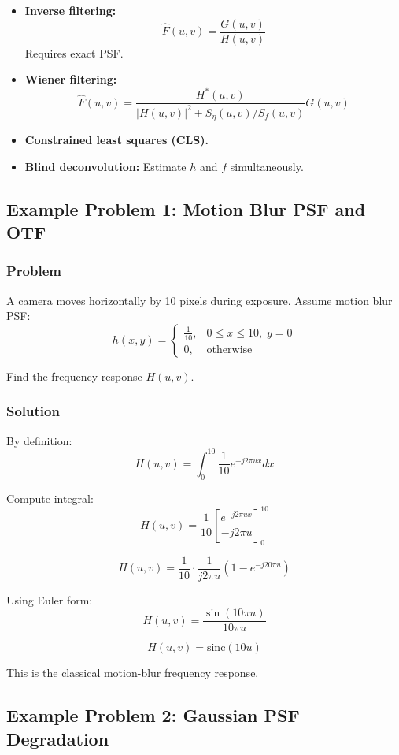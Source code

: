 \documentclass{AnantDocumentation}
\begin{document}
\begin{itemize}
\item \textbf{Inverse filtering:}
\[
\hat{F}(u,v) = \frac{G(u,v)}{H(u,v)}
\]
Requires exact PSF.

\item \textbf{Wiener filtering:}
\[
\hat{F}(u,v) = \frac{H^*(u,v)}
{|H(u,v)|^2 + S_\eta(u,v)/S_f(u,v)} G(u,v)
\]

\item \textbf{Constrained least squares (CLS).}

\item \textbf{Blind deconvolution:}  
Estimate \( h \) and \( f \) simultaneously.
\end{itemize}

\subsection{Example Problem 1: Motion Blur PSF and OTF}

\subsubsection*{Problem}

A camera moves horizontally by 10 pixels during exposure.  
Assume motion blur PSF:
\[
h(x,y) = 
\begin{cases}
\frac{1}{10}, & 0 \le x \le 10, \; y=0\\
0, & \text{otherwise}
\end{cases}
\]

Find the frequency response \( H(u,v) \).

\subsubsection*{Solution}

By definition:
\[
H(u,v) = \int_{0}^{10} \frac{1}{10} e^{-j2\pi ux} dx
\]

Compute integral:
\[
H(u,v) = \frac{1}{10} \left[ \frac{e^{-j2\pi ux}}{-j2\pi u} \right]_{0}^{10}
\]

\[
H(u,v) = \frac{1}{10} \cdot \frac{1}{j2\pi u}
\left(1 - e^{-j20\pi u}\right)
\]

Using Euler form:
\[
H(u,v) = \frac{\sin(10\pi u)}{10\pi u}
\]

\[
\boxed{
H(u,v) = \text{sinc}(10u)
}
\]

This is the classical motion-blur frequency response.

\subsection{Example Problem 2: Gaussian PSF Degradation}
\end{document}
